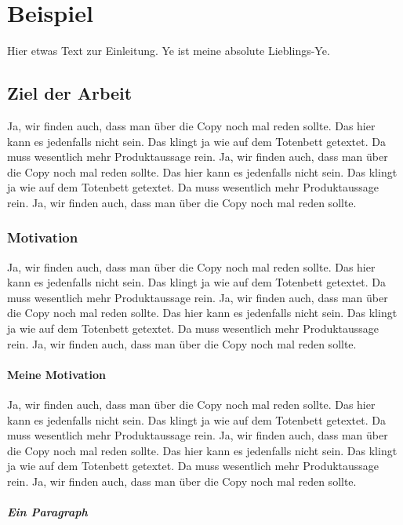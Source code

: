 

\chapter{Beispiel}

Hier etwas Text zur Einleitung. Ye ist meine absolute Lieblings-Ye.


\section{Ziel der Arbeit}

Ja, wir finden auch, dass man über die Copy noch mal reden sollte. Das hier kann es jedenfalls nicht sein. Das klingt ja wie auf dem Totenbett getextet. Da muss wesentlich mehr Produktaussage rein. Ja, wir finden auch, dass man über die Copy noch mal reden sollte. Das hier kann es jedenfalls nicht sein. Das klingt ja wie auf dem Totenbett getextet. Da muss wesentlich mehr Produktaussage rein. Ja, wir finden auch, dass man über die Copy noch mal reden sollte.


\subsection{Motivation}

Ja, wir finden auch, dass man über die Copy noch mal reden sollte. Das hier kann es jedenfalls nicht sein. Das klingt ja wie auf dem Totenbett getextet. Da muss wesentlich mehr Produktaussage rein. Ja, wir finden auch, dass man über die Copy noch mal reden sollte. Das hier kann es jedenfalls nicht sein. Das klingt ja wie auf dem Totenbett getextet. Da muss wesentlich mehr Produktaussage rein. Ja, wir finden auch, dass man über die Copy noch mal reden sollte.


\subsubsection{Meine Motivation}

Ja, wir finden auch, dass man über die Copy noch mal reden sollte. Das hier kann es jedenfalls nicht sein. Das klingt ja wie auf dem Totenbett getextet. Da muss wesentlich mehr Produktaussage rein. Ja, wir finden auch, dass man über die Copy noch mal reden sollte. Das hier kann es jedenfalls nicht sein. Das klingt ja wie auf dem Totenbett getextet. Da muss wesentlich mehr Produktaussage rein. Ja, wir finden auch, dass man über die Copy noch mal reden sollte.


\paragraph{Ein Paragraph}

